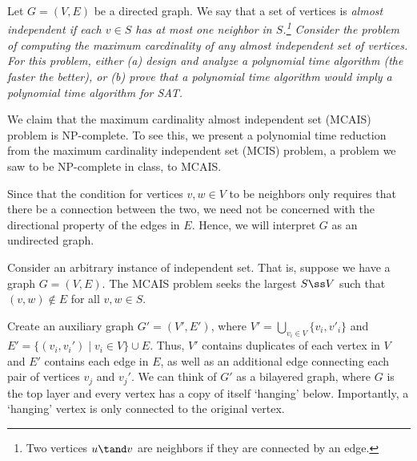 \documentclass{article}
\begin{document}
\setcounter{section}{13}
\setcounter{exercise}{3}
\begin{exercise}
Let \( G=(V,E) \) be a directed graph.
We say that a set of vertices is \it{almost independent} if each \( v\in S \) has at most one neighbor in \( S \).\footnote[5]{Two vertices \( u \tand v \) are neighbors if they are connected by an edge.}
Consider the problem of computing the maximum carcdinality of any almost independent set of vertices.
For this problem, either (a) design and analyze a polynomial time algorithm (the faster the better), or (b) prove that a polynomial time algorithm would imply a polynomial time algorithm for SAT.
\end{exercise}

\begin{solution}
  We claim that the maximum cardinality almost independent set (MCAIS) problem is NP-complete.
  To see this, we present a polynomial time reduction from the maximum cardinality independent set (MCIS) problem, a problem we saw to be NP-complete in class, to MCAIS.

  \begin{note}
    Since that the condition for vertices \( v,w\in V \) to be neighbors only requires that there be a connection between the two, we need not be concerned with the directional property of the edges in \( E \).
    Hence, we will interpret \( G \) as an undirected graph.
  \end{note}

  Consider an arbitrary instance of independent set.
  That is, suppose we have a graph \( G=(V,E) \).
  The MCAIS problem seeks the largest \( S\ss V \) such that \( (v,w)\not\in E \) for all \( v,w\in S \).

  Create an auxiliary graph \( G'=(V',E') \), where \( V'=\bigcup\limits_{v_i\in V}\{v_i,v'_i\} \) and \( E'=\{(v_i,v_i')\mid v_i\in V\}\cup E \).
  Thus, \( V' \) contains duplicates of each vertex in \( V \) and \( E' \) contains each edge in \( E \), as well as an additional edge connecting each pair of vertices \( v_j \) and \( v_j' \).
  We can think of \( G' \) as a bilayered graph, where \( G \) is the top layer and every vertex has a copy of itself `hanging' below.
  Importantly, a `hanging' vertex is only connected to the original vertex.


\end{solution}
\end{document}
